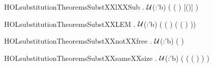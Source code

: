 \newcommand{\HOLsubstitutionTheoremsSubstXXind}{\UseVerbatim{HOLsubstitutionTheoremsSubstXXind}}
\begin{SaveVerbatim}{HOLsubstitutionTheoremsSubstXXlXXSub}
\HOLTokenTurnstile{} \HOLSymConst{\HOLTokenForall{}}  .
      \ensuremath{\cal{U}}(:'b) \HOLSymConst{\HOLTokenImp{}} ( ( )   \HOLSymConst{=}  [(\HOLSymConst{,})] )
\end{SaveVerbatim}
\newcommand{\HOLsubstitutionTheoremsSubstXXlXXSub}{\UseVerbatim{HOLsubstitutionTheoremsSubstXXlXXSub}}
\begin{SaveVerbatim}{HOLsubstitutionTheoremsSubstXXLEM}
\HOLTokenTurnstile{} \HOLSymConst{\HOLTokenForall{}}    .
      \ensuremath{\cal{U}}(:'b) \HOLSymConst{\HOLTokenImp{}}
     (  (   )  \HOLSymConst{=}
         (  (   ) ))
\end{SaveVerbatim}
\newcommand{\HOLsubstitutionTheoremsSubstXXLEM}{\UseVerbatim{HOLsubstitutionTheoremsSubstXXLEM}}
\begin{SaveVerbatim}{HOLsubstitutionTheoremsSubstXXnotXXfree}
\HOLTokenTurnstile{} \HOLSymConst{\HOLTokenForall{}}  .  \ensuremath{\cal{U}}(:'b) \HOLSymConst{\HOLTokenImp{}}  \HOLConst{\HOLTokenNotIn{}}   \HOLSymConst{\HOLTokenImp{}} (    \HOLSymConst{=} )
\end{SaveVerbatim}
\newcommand{\HOLsubstitutionTheoremsSubstXXnotXXfree}{\UseVerbatim{HOLsubstitutionTheoremsSubstXXnotXXfree}}
\begin{SaveVerbatim}{HOLsubstitutionTheoremsSubstXXsameXXsize}
\HOLTokenTurnstile{} \HOLSymConst{\HOLTokenForall{}}  .
      \ensuremath{\cal{U}}(:'b) \HOLSymConst{\HOLTokenImp{}}
     ( ( ( )  ) \HOLSymConst{=}  )
\end{SaveVerbatim}
